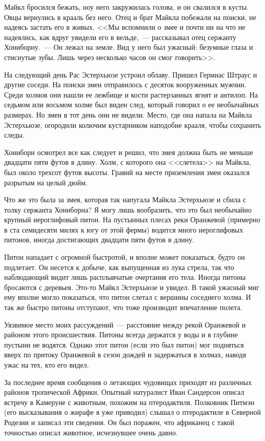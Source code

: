 \documentclass[12pt,a4paper,twoside,openany,svgnames]{memoir}
\begin{document}
Майкл бросился бежать, ноу него закружилась голова, и он свалился в кусты. Овцы вернулись в крааль без него. Отец и брат Майкла побежали на поиски, не надеясь застать его в живых. <<Мы вспомнили о змее и почти ни на что не надеялись, как вдруг увидели его в вельде,~--- рассказывал отец сержанту Хониборну.~--- Он лежал на земле. Вид у него был ужасный: безумные глаза и стиснутые зубы. Лишь через несколько часов он смог говорить>>.

На следующий день Рас Эстерхьюзе устроил облаву. Пришел Гермиас Штраус и другие соседи. На поиски змеи отправилось с десяток вооруженных мужчин. Среди холмов они нашли ее лежбище и кости растерзанных ягнят и антилоп. На седьмом или восьмом холме был виден след, который говорил о ее необычайных размерах. Но змеи в тот день они не видели. Место, где она напала на Майкла Эстерхьюзе, огородили колючим кустарником наподобие крааля, чтобы сохранить следы.

Хониборн осмотрел все как следует и решил, что змея должна быть не меньше двадцати пяти футов в длину. Холм, с которого она <<слетела>> на Майкла, был около трехсот футов высоты. Гравий на месте приземления змеи оказался разрытым на целый дюйм.

Что же это была за змея, которая так напугала Майкла Эстерхьюзе и сбила с толку сержанта Хониборна? Я могу лишь вообразить, что это был необычайно крупный иероглифовый питон. На пустынных плесах реки Оранжевой (примерно в ста семидесяти милях к югу от этой фермы) водится много иероглифовых питонов, иногда достигающих двадцати пяти футов в длину.

Питон нападает с огромной быстротой, и вполне может показаться, будто он подлетает. Он несется к добыче, как выпущенная из лука стрела, так что наблюдающий видит лишь расплывчатые очертания его тела. Иногда питоны бросаются с деревьев. Это-то Майкл Эстерхьюзе и увидел. В такой ужасный миг ему вполне могло показаться, что питон слетал с вершины соседнего холма. И так же быстро питоны отступают, что тоже производит впечатление полета.

Уязвимое место моих рассуждений~--- расстояние между рекой Оранжевой и районом этого происшествия. Питоны всегда держатся у воды и в глубине пустыни не водятся. Однако этот питон (если это был питон) мог подняться вверх по притоку Оранжевой в сезон дождей и задержаться в холмах, наводя ужас на тех, кто его видел.

За последнее время сообщения о летающих чудовищах приходят из различных районов тропической Африки. Опытный натуралист Иван Сандерсон описал встречу в Камеруне с животным, похожим на птеродактиля. Полковник Питмэн (его высказывания о жирафе я уже приводил) слышал о птеродактиле в Северной Родезии и записал эти сведения. Он был поражен, что африканец с такой точностью описал животное, исчезнувшее очень давно.
\end{document}

